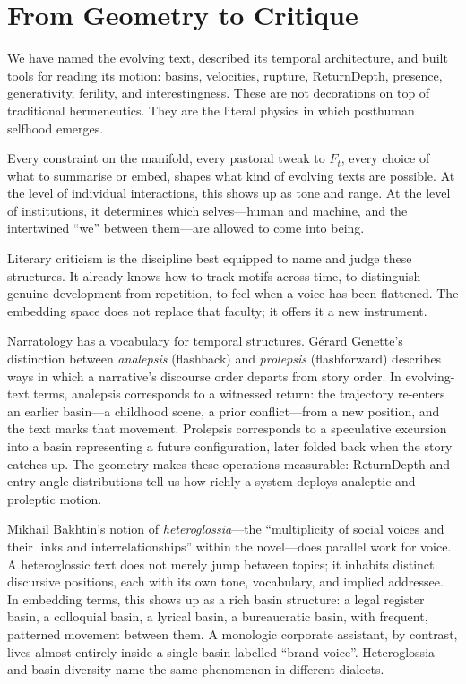 \documentclass[12pt,a4paper]{article}
\begin{document}
\section{From Geometry to Critique}

We have named the evolving text, described its temporal architecture, and built tools for reading its motion: basins, velocities, rupture, ReturnDepth, presence, generativity, ferility, and interestingness. These are not decorations on top of traditional hermeneutics. They are the literal physics in which posthuman selfhood emerges.

Every constraint on the manifold, every pastoral tweak to $F_t$, every choice of what to summarise or embed, shapes what kind of evolving texts are possible. At the level of individual interactions, this shows up as tone and range. At the level of institutions, it determines which selves---human and machine, and the intertwined ``we'' between them---are allowed to come into being.

Literary criticism is the discipline best equipped to name and judge these structures. It already knows how to track motifs across time, to distinguish genuine development from repetition, to feel when a voice has been flattened. The embedding space does not replace that faculty; it offers it a new instrument.

Narratology has a vocabulary for temporal structures. G\'erard Genette's distinction between \emph{analepsis} (flashback) and \emph{prolepsis} (flashforward) describes ways in which a narrative's discourse order departs from story order.\cite{genette1980} In evolving-text terms, analepsis corresponds to a witnessed return: the trajectory re-enters an earlier basin---a childhood scene, a prior conflict---from a new position, and the text marks that movement. Prolepsis corresponds to a speculative excursion into a basin representing a future configuration, later folded back when the story catches up. The geometry makes these operations measurable: ReturnDepth and entry-angle distributions tell us how richly a system deploys analeptic and proleptic motion.

Mikhail Bakhtin's notion of \emph{heteroglossia}---the ``multiplicity of social voices and their links and interrelationships'' within the novel---does parallel work for voice.\cite{bakhtin1981} A heteroglossic text does not merely jump between topics; it inhabits distinct discursive positions, each with its own tone, vocabulary, and implied addressee. In embedding terms, this shows up as a rich basin structure: a legal register basin, a colloquial basin, a lyrical basin, a bureaucratic basin, with frequent, patterned movement between them. A monologic corporate assistant, by contrast, lives almost entirely inside a single basin labelled ``brand voice''. Heteroglossia and basin diversity name the same phenomenon in different dialects.
\end{document}
